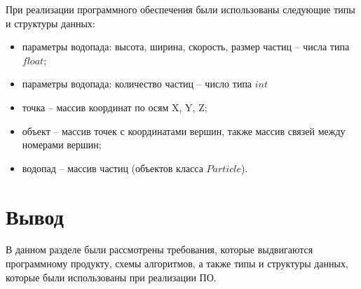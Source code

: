 При реализации программного обеспечения были использованы следующие типы и структуры данных:

\begin{itemize}
    \item параметры водопада: высота, ширина, скорость, размер частиц -- числа типа $float$;
    \item параметры водопада: количество частиц -- число типа $int$
    \item точка -- массив координат по осям X, Y, Z;
    \item объект -- массив точек с координатами вершин, также массив связей между номерами вершин;
    \item водопад -- массив частиц (объектов класса $Particle$).
\end{itemize}


\section*{Вывод}

В данном разделе были рассмотрены требования, которые выдвигаются программному продукту, схемы алгоритмов, а также типы и структуры данных, которые были использованы при реализации ПО. 
